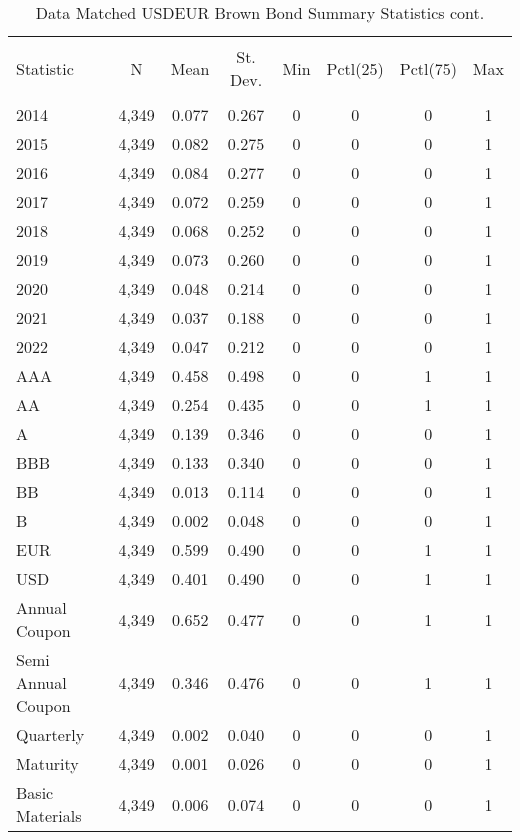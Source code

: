 \begin{table}[!htbp] \centering 
  \footnotesize
  \caption{Data Matched USDEUR Brown Bond Summary Statistics cont.} 
  \label{} 
\begin{tabular}{@{\extracolsep{5pt}}lccccccc} 
\\[-1.8ex]\hline 
\hline \\[-1.8ex] 
Statistic & \multicolumn{1}{c}{N} & \multicolumn{1}{c}{Mean} & \multicolumn{1}{c}{St. Dev.} & \multicolumn{1}{c}{Min} & \multicolumn{1}{c}{Pctl(25)} & \multicolumn{1}{c}{Pctl(75)} & \multicolumn{1}{c}{Max} \\ 
\hline \\[-1.8ex] 
2014 & 4,349 & 0.077 & 0.267 & 0 & 0 & 0 & 1 \\ 
2015 & 4,349 & 0.082 & 0.275 & 0 & 0 & 0 & 1 \\ 
2016 & 4,349 & 0.084 & 0.277 & 0 & 0 & 0 & 1 \\ 
2017 & 4,349 & 0.072 & 0.259 & 0 & 0 & 0 & 1 \\ 
2018 & 4,349 & 0.068 & 0.252 & 0 & 0 & 0 & 1 \\ 
2019 & 4,349 & 0.073 & 0.260 & 0 & 0 & 0 & 1 \\ 
2020 & 4,349 & 0.048 & 0.214 & 0 & 0 & 0 & 1 \\ 
2021 & 4,349 & 0.037 & 0.188 & 0 & 0 & 0 & 1 \\ 
2022 & 4,349 & 0.047 & 0.212 & 0 & 0 & 0 & 1 \\ 
AAA & 4,349 & 0.458 & 0.498 & 0 & 0 & 1 & 1 \\ 
AA & 4,349 & 0.254 & 0.435 & 0 & 0 & 1 & 1 \\ 
A & 4,349 & 0.139 & 0.346 & 0 & 0 & 0 & 1 \\ 
BBB & 4,349 & 0.133 & 0.340 & 0 & 0 & 0 & 1 \\ 
BB & 4,349 & 0.013 & 0.114 & 0 & 0 & 0 & 1 \\ 
B & 4,349 & 0.002 & 0.048 & 0 & 0 & 0 & 1 \\ 
EUR & 4,349 & 0.599 & 0.490 & 0 & 0 & 1 & 1 \\ 
USD & 4,349 & 0.401 & 0.490 & 0 & 0 & 1 & 1 \\ 
Annual Coupon & 4,349 & 0.652 & 0.477 & 0 & 0 & 1 & 1 \\ 
Semi Annual Coupon & 4,349 & 0.346 & 0.476 & 0 & 0 & 1 & 1 \\ 
Quarterly & 4,349 & 0.002 & 0.040 & 0 & 0 & 0 & 1 \\ 
Maturity & 4,349 & 0.001 & 0.026 & 0 & 0 & 0 & 1 \\ 
Basic Materials & 4,349 & 0.006 & 0.074 & 0 & 0 & 0 & 1 \\ 

\end{tabular}
\end{table}
